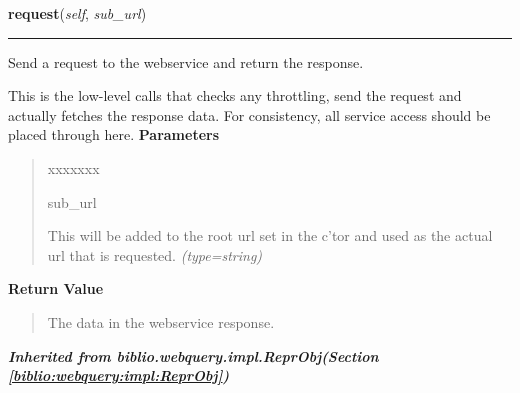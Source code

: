     \label{biblio:webquery:basewebquery:BaseWebquery:request}

    \vspace{0.5ex}

\hspace{.8\funcindent}\begin{boxedminipage}{\funcwidth}

    \raggedright \textbf{request}(\textit{self}, \textit{sub\_url})

    \vspace{-1.5ex}

    \rule{\textwidth}{0.5\fboxrule}
\setlength{\parskip}{2ex}

Send a request to the webservice and return the response.

This is the low-level calls that checks any throttling, send the request
and actually fetches the response data. For consistency, all service
access should be placed through here.
\setlength{\parskip}{1ex}
      \textbf{Parameters}
      \vspace{-1ex}

      \begin{quote}
        \begin{Ventry}{xxxxxxx}

          \item[sub\_url]


This will be added to the root url set in the c'tor and used as the
actual url that is requested.
            {\it (type=string)}

        \end{Ventry}

      \end{quote}

      \textbf{Return Value}
    \vspace{-1ex}

      \begin{quote}

The data in the webservice response.
      \end{quote}

    \end{boxedminipage}


\large{\textbf{\textit{Inherited from biblio.webquery.impl.ReprObj\textit{(Section \ref{biblio:webquery:impl:ReprObj})}}}}

